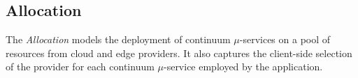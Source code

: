 




\subsection{Allocation}\label{sec:A3-E-allocation}



The \textit{Allocation} models the deployment of continuum $\mu$-services on a pool of resources from cloud and edge providers. It also captures the client-side selection of the provider for each continuum $\mu$-service employed by the application.


